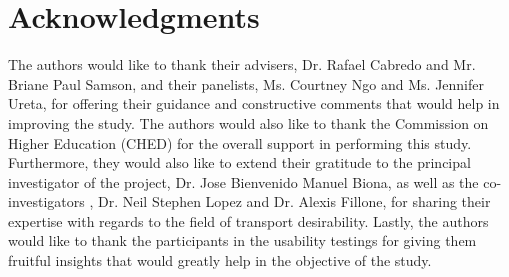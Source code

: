 \documentclass{sigchi}
\begin{document}





\section{Acknowledgments}

The authors would like to thank their advisers, Dr. Rafael Cabredo and Mr. Briane Paul Samson, and their panelists, Ms. Courtney Ngo and Ms. Jennifer Ureta, for offering their guidance and constructive comments that would help in improving the study. The authors would also like to thank the Commission on Higher Education (CHED) for the overall support in performing this study. Furthermore, they would also like to extend their gratitude to the principal investigator of the project, Dr. Jose Bienvenido Manuel Biona, as well as the co-investigators , Dr. Neil Stephen Lopez and Dr. Alexis Fillone, for sharing their expertise with regards to the field of transport desirability. Lastly, the authors would like to thank the participants in the usability testings for giving them fruitful insights that would greatly help in the objective of the study.
\end{document}
